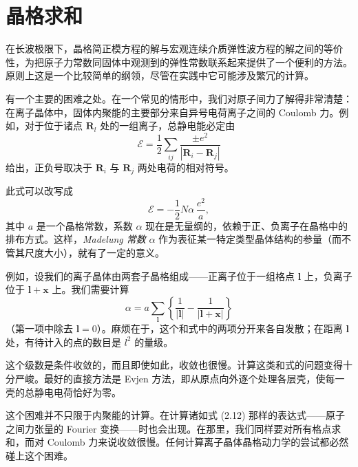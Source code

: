 
\section{晶格求和}

在长波极限下，晶格简正模方程的解与宏观连续介质弹性波方程的解之间的等价性，为把原子力常数同固体中观测到的弹性常数联系起来提供了一个便利的方法。原则上这是一个比较简单的纲领，尽管在实践中它可能涉及繁冗的计算。

有一个主要的困难之处。在一个常见的情形中，我们对原子间力了解得非常清楚：在离子晶体中，固体内聚能的主要部分来自异号电荷离子之间的 Coulomb 力。例如，对于位于诸点 $\mathbf{R}_l$ 处的一组离子，总静电能必定由
\begin{equation*}
\mathcal{E} = \frac{1}{2}\sum_{ij} \frac{\pm e^2}{|\mathbf{R}_i - \mathbf{R}_j|}
\tag{2.26}
\end{equation*}
给出，正负号取决于 $\mathbf{R}_i$ 与 $\mathbf{R}_j$ 两处电荷的相对符号。

此式可以改写成
\begin{equation*}
\mathcal{E} = -\frac{1}{2}N\alpha\,\frac{e^2}{a},
\tag{2.27}
\end{equation*}
其中 $a$ 是一个晶格常数，系数 $\alpha$ 现在是无量纲的，依赖于正、负离子在晶格中的排布方式。这样，\emph{Madelung 常数} $\alpha$ 作为表征某一特定类型晶体结构的参量（而不管其尺度大小），就有了一定的意义。


例如，设我们的离子晶体由两套子晶格组成——正离子位于一组格点 $\boldsymbol{l}$ 上，负离子位于 $\boldsymbol{l}+\mathbf{x}$ 上。我们需要计算
\begin{equation*}
\alpha = a\sum_{\boldsymbol{l}}\left\{\frac{1}{|\boldsymbol{l}|} - \frac{1}{|\boldsymbol{l}+\mathbf{x}|}\right\}
\tag{2.28}
\end{equation*}
（第一项中除去 $\boldsymbol{l}=0$）。麻烦在于，这个和式中的两项分开来各自发散；在距离 $\boldsymbol{l}$ 处，有待计入的点的数目是 $l^2$ 的量级。

这个级数是条件收敛的，而且即使如此，收敛也很慢。计算这类和式的问题变得十分严峻。最好的直接方法是 Evjen 方法，即从原点向外逐个处理各层壳，使每一壳的总静电电荷恰好为零。

这个困难并不只限于内聚能的计算。在计算诸如式 (2.12) 那样的表达式——原子之间力张量的 Fourier 变换——时也会出现。在那里，我们同样要对所有格点求和，而对 Coulomb 力来说收敛很慢。任何计算离子晶体晶格动力学的尝试都必然碰上这个困难。

